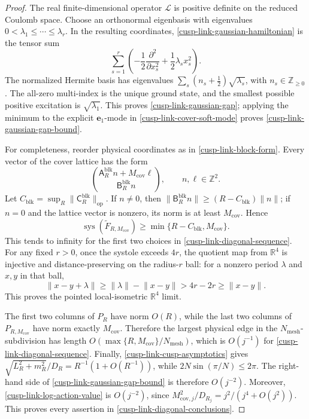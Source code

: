 \begin{proof}
The real finite-dimensional operator \(\mathcal L\) is positive definite on
the reduced Coulomb space.  Choose an orthonormal eigenbasis with eigenvalues
\(0<\lambda_1\leq\cdots\leq\lambda_r\).  In the resulting coordinates,
\eqref{cusp-link-gaussian-hamiltonian} is the tensor sum
\[
 \sum_{s=1}^r
 \left(-\frac12\frac{\partial^2}{\partial x_s^2}
       +\frac12\lambda_sx_s^2\right).
\]
The normalized Hermite basis has eigenvalues
\(\sum_s(n_s+\tfrac12)\sqrt{\lambda_s}\), with
\(n_s\in\mathbb Z_{\geq0}\).  The all-zero multi-index is the unique ground
state, and the smallest possible positive excitation is
\(\sqrt{\lambda_1}\).  This proves \eqref{cusp-link-gaussian-gap}; applying
the minimum to the explicit \(\mathbf e_1\)-mode in
\eqref{cusp-link-cover-soft-mode} proves
\eqref{cusp-link-gaussian-gap-bound}.

For completeness, reorder physical coordinates as in
\eqref{cusp-link-block-form}.  Every vector of the cover lattice has the
form
\[
 \binom{\mathsf A_R^{\mathrm{blk}}n+M_{\mathrm{cov}}\ell}
       {\mathsf B_R^{\mathrm{blk}}n},
 \qquad n,\ell\in\mathbb Z^2.
\]
Let \(C_{\mathrm{blk}}=\sup_R
\lVert\mathsf C_R^{\mathrm{blk}}\rVert_{\mathrm{op}}\).  If \(n\neq0\), then
\(\lVert\mathsf B_R^{\mathrm{blk}}n\rVert
\geq(R-C_{\mathrm{blk}})\lVert n\rVert\); if \(n=0\) and the lattice
vector is nonzero, its norm is at least \(M_{\mathrm{cov}}\).  Hence
\begin{equation}
 \operatorname{sys}(\widetilde F_{R,M_{\mathrm{cov}}})
 \geq\min\{R-C_{\mathrm{blk}},M_{\mathrm{cov}}\}.
 \label{cusp-link-cover-systole-bound}
\end{equation}
This tends to infinity for the first two choices in
\eqref{cusp-link-diagonal-sequence}.  For any fixed \(r>0\), once the
systole exceeds \(4r\), the quotient map from \(\mathbb R^4\) is injective
and distance-preserving on the radius-\(r\) ball: for a nonzero period
\(\lambda\) and \(x,y\) in that ball,
\[
 \lVert x-y+\lambda\rVert
 \geq\lVert\lambda\rVert-\lVert x-y\rVert
 >4r-2r\geq\lVert x-y\rVert.
\]
This proves the pointed local-isometric \(\mathbb R^4\) limit.

The first two columns of \(P_R\) have norm \(O(R)\), while the last two
columns of \(P_{R,M_{\mathrm{cov}}}\) have norm exactly
\(M_{\mathrm{cov}}\).  Therefore the largest physical edge in the
\(N_{\mathrm{mesh}}\)-subdivision has length
\(O(\max\{R,M_{\mathrm{cov}}\}/N_{\mathrm{mesh}})\), which is \(O(j^{-1})\)
for \eqref{cusp-link-diagonal-sequence}.  Finally,
\eqref{cusp-link-cusp-asymptotics} gives
\(\sqrt{L_R^2+m_R^2}/D_R=R^{-1}(1+O(R^{-1}))\), while
\(2N\sin(\pi/N)\leq2\pi\).  The right-hand side of
\eqref{cusp-link-gaussian-gap-bound} is therefore \(O(j^{-2})\).
Moreover, \eqref{cusp-link-log-action-value} is \(O(j^{-2})\), since
\(M_{\mathrm{cov},j}^2/D_{R_j}=j^2/(j^4+O(j^2))\).
This proves every assertion in \eqref{cusp-link-diagonal-conclusions}.
\end{proof}

